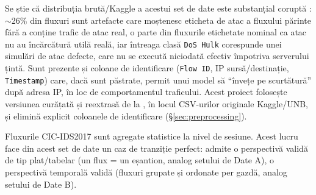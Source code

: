 Se știe că distribuția brută/Kaggle a acestui set de date este substanțial coruptă \parencite{engelen2021troubleshooting}: $\sim$26\% din fluxuri sunt artefacte care moștenesc eticheta de atac a fluxului părinte fără a conține trafic de atac real, o parte din fluxurile etichetate nominal ca atac nu au încărcătură utilă reală, iar întreaga clasă \texttt{DoS Hulk} corespunde unei simulări de atac defecte, care nu se execută niciodată efectiv împotriva serverului țintă. Sunt prezente și coloane de identificare (\texttt{Flow ID}, IP sursă/destinație, \texttt{Timestamp}) care, dacă sunt păstrate, permit unui model să \enquote{învețe pe scurtătură} după adresa IP, în loc de comportamentul traficului. Acest proiect folosește versiunea curățată și reextrasă de la \textcite{engelen2021troubleshooting}, în locul CSV-urilor originale Kaggle/UNB, și elimină explicit coloanele de identificare (\S\ref{sec:preprocessing}).

Fluxurile CIC-IDS2017 sunt agregate statistice la nivel de sesiune. Acest lucru face din acest set de date un caz de tranziție perfect: admite o perspectivă validă de tip plat/tabelar (un flux = un eșantion, analog setului de Date A), o perspectivă temporală validă (fluxuri grupate și ordonate per gazdă, analog setului de Date B).